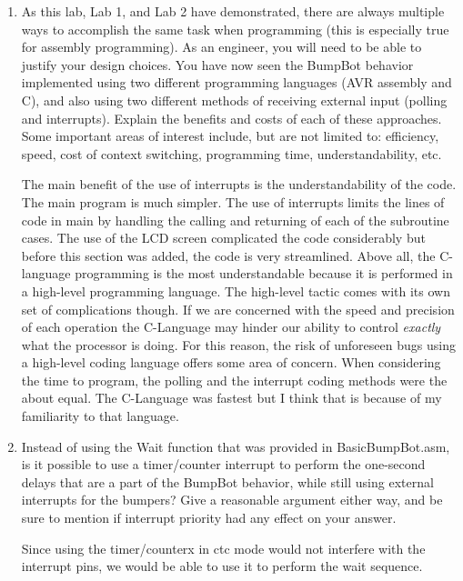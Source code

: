 \documentclass[12pt, letterpaper]{article}
\begin{document}
\begin{enumerate}
    \item
As this lab, Lab 1, and Lab 2 have demonstrated, there are always multiple ways to accomplish the same task when programming (this is especially true for assembly programming). As an engineer, you will need to be able to justify your design choices. You have now seen the BumpBot behavior implemented using two different programming languages (AVR assembly and C), and also using two different methods of receiving external input (polling and interrupts). Explain the benefits and costs of each of these approaches. Some important areas of interest include, but are not limited to: efficiency, speed, cost of context switching, programming time, understandability, etc. \newline \newline

The main benefit of the use of interrupts is the understandability of the code. The main program is much simpler. The use of interrupts limits the lines of code in main by handling the calling and returning of each of the subroutine cases. The use of the LCD screen complicated the code considerably but before this section was added, the code is very streamlined. Above all, the C-language programming is the most understandable because it is performed in a high-level programming language. The high-level tactic comes with its own set of complications though. If we are concerned with the speed and precision of each operation the C-Language may hinder our ability to control \textit{exactly} what the processor is doing. For this reason, the risk of unforeseen bugs using a high-level coding language offers some area of concern.
When considering the time to program, the polling and the interrupt coding methods were the about equal. The C-Language was fastest but I think that is because of my familiarity to that language.


\item
Instead of using the Wait function that was provided in \newline BasicBumpBot.asm, is it possible to use a timer/counter interrupt to perform the one-second delays that are a part of the BumpBot behavior, while still using external interrupts for the bumpers? Give a reasonable argument either way, and be sure to mention if interrupt priority had any effect on your answer.

Since using the timer/counterx in ctc mode would not interfere with the interrupt pins, we would be able to use it to perform the wait sequence.


\end{enumerate}
\end{document}
